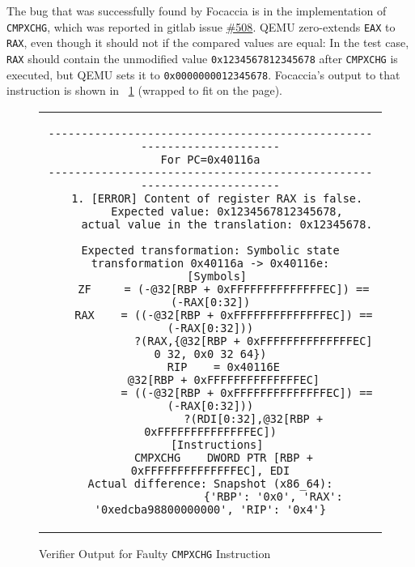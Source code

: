 The bug that was successfully found by Focaccia is in the implementation of \texttt{CMPXCHG}, which was reported in
gitlab issue \href{https://gitlab.com/qemu-project/qemu/-/issues/508}{\#508}. QEMU zero-extends \texttt{EAX} to
\texttt{RAX}, even though it should not if the compared values are equal: In the test case, \texttt{RAX} should contain
the unmodified value \texttt{0x1234567812345678} after \texttt{CMPXCHG} is executed, but QEMU sets it to
\texttt{0x0000000012345678}. Focaccia's output to that instruction is shown in \lstlistingname~\ref{fig:cmpxchg}
(wrapped to fit on the page).

\begin{figure}[htb]
    \centering
    \begin{tabular}{c}
    \begin{lstlisting}
----------------------------------------------------------------------
For PC=0x40116a
----------------------------------------------------------------------
  1. [ERROR] Content of register RAX is false.
     Expected value: 0x1234567812345678,
     actual value in the translation: 0x12345678.

Expected transformation: Symbolic state transformation 0x40116a -> 0x40116e:
  [Symbols]
    ZF     = (-@32[RBP + 0xFFFFFFFFFFFFFFEC]) == (-RAX[0:32])
    RAX    = ((-@32[RBP + 0xFFFFFFFFFFFFFFEC]) == (-RAX[0:32]))
             ?(RAX,{@32[RBP + 0xFFFFFFFFFFFFFFEC] 0 32, 0x0 32 64})
    RIP    = 0x40116E
    @32[RBP + 0xFFFFFFFFFFFFFFEC]
           = ((-@32[RBP + 0xFFFFFFFFFFFFFFEC]) == (-RAX[0:32]))
             ?(RDI[0:32],@32[RBP + 0xFFFFFFFFFFFFFFEC])
  [Instructions]
    CMPXCHG    DWORD PTR [RBP + 0xFFFFFFFFFFFFFFEC], EDI
Actual difference: Snapshot (x86_64):
                   {'RBP': '0x0', 'RAX': '0xedcba98800000000', 'RIP': '0x4'}
    \end{lstlisting}
    \end{tabular}
    \caption{Verifier Output for Faulty \texttt{CMPXCHG} Instruction}\label{fig:cmpxchg}
\end{figure}
